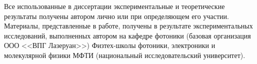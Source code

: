 {\contribution} Все использованные в диссертации экспериментальные и теоретические результаты получены автором лично или при определяющем его участии. Материалы, представленные в работе, получены в результате экспериментальных исследований, выполненных автором на кафедре фотоники (базовая организация ООО <<ВПГ Лазеруан>>) Физтех-школы фотоники, электроники и молекулярной физики МФТИ (национальный исследовательский университет).

%
